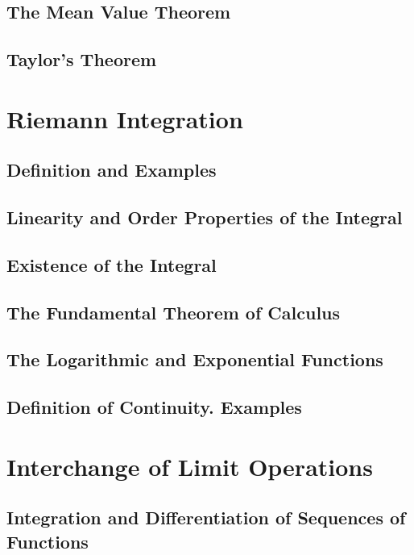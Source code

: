 \documentclass{article}
\begin{document}
		\subsection{The Mean Value Theorem}
		
		\subsection{Taylor's Theorem}	
	
	\section{Riemann Integration}
		\subsection{Definition and Examples}
		
		\subsection{Linearity and Order Properties of the Integral}
		
		\subsection{Existence of the Integral}
		
		\subsection{The Fundamental Theorem of Calculus}
		
		\subsection{The Logarithmic and Exponential Functions}
		
		\subsection{Definition of Continuity. Examples}
	
	
	\section{Interchange of Limit Operations}
		\subsection{Integration and Differentiation of Sequences of Functions}
		
\end{document}
